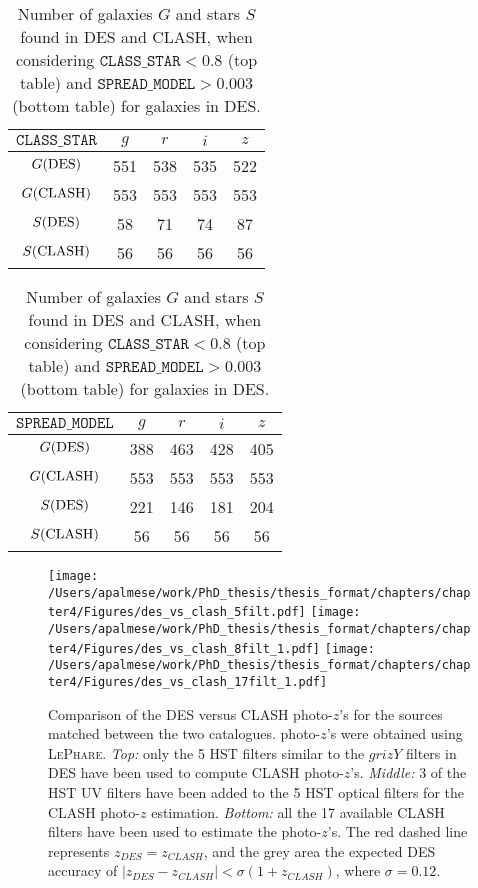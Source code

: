 {\begin{table}\centering
\begin{tabular}{c|cccc}
$\texttt{CLASS\_STAR}$&$g$&$r$&$i$&$z$\\
\hline
 $ G({\rm DES})$&    551&      538&      535&      522\\
  $G({\rm CLASH})$ &   553 &      553&      553   &   553\\
   $S({\rm  DES})$&  58 &      71&      74&      87\\
   $S({\rm CLASH})$& 56&      56&      56&      56\\
\end{tabular}\hskip 0.3cm
\begin{tabular}{c|cccc}
 $\texttt{SPREAD\_MODEL}$&$g$&$r$&$i$&$z$\\
\hline
 $ G({\rm DES})$&    388&      463&      428&      405\\
 $G({\rm CLASH})$ &   553 &      553&      553   &   553\\
   $S({\rm DES})$&  221 &      146&     181&      204\\
  $S({\rm CLASH})$& 56&      56&      56&      56\\
\end{tabular}\caption{Number of galaxies $G$ and stars $S$ found in DES and CLASH, when considering $\texttt{CLASS\_STAR}<0.8$ (top table) and $\texttt{SPREAD\_MODEL}>0.003$ (bottom table) for galaxies in DES.}\label{numbergal}
\end{table}
\begin{figure}
\vspace{ -0.5cm}\texttt{[image: /Users/apalmese/work/PhD\_thesis/thesis\_format/chapters/chapter4/Figures/des\_vs\_clash\_5filt.pdf]} \hspace{-0.1cm}\texttt{[image: /Users/apalmese/work/PhD\_thesis/thesis\_format/chapters/chapter4/Figures/des\_vs\_clash\_8filt\_1.pdf]} \hspace{-0.22cm} \texttt{[image: /Users/apalmese/work/PhD\_thesis/thesis\_format/chapters/chapter4/Figures/des\_vs\_clash\_17filt\_1.pdf]}
\caption{Comparison of the DES versus CLASH photo-$z$'s for the sources matched between the two catalogues. photo-$z$'s were obtained using \textsc{LePhare}. \emph{Top:} only the 5 HST filters similar to the $grizY$ filters in DES have been used to compute CLASH photo-$z$'s. \emph{Middle:} 3 of the HST UV filters have been added to the 5 HST optical filters for the CLASH photo-$z$ estimation. \emph{Bottom:} all the 17 available CLASH filters have been used to estimate the photo-$z$'s. The red dashed line represents $z_{DES}=z_{CLASH}$, and the grey area the expected DES accuracy of $|z_{DES}-z_{CLASH}|< \sigma(1+z_{CLASH})$, where $\sigma=0.12$.}\label{photoz}
\end{figure}

}
